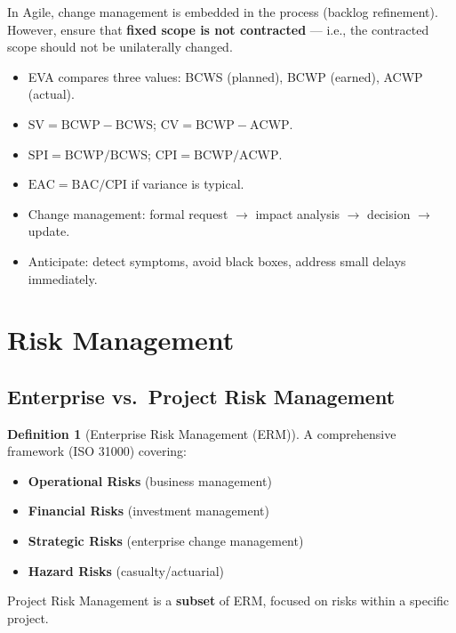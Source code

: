 \documentclass[11pt,a4paper]{article}
\theoremstyle{definition}
\newtheorem{definition}{Definition}[section]
\theoremstyle{plain}
\begin{document}
\begin{remark}
In Agile, change management is embedded in the process (backlog refinement). However, ensure that \textbf{fixed scope is not contracted} --- i.e., the contracted scope should not be unilaterally changed.
\end{remark}

\begin{keytakeaways}
\begin{itemize}[nosep]
  \item EVA compares three values: BCWS (planned), BCWP (earned), ACWP (actual).
  \item $\mathrm{SV} = \mathrm{BCWP} - \mathrm{BCWS}$; $\mathrm{CV} = \mathrm{BCWP} - \mathrm{ACWP}$.
  \item $\mathrm{SPI} = \mathrm{BCWP}/\mathrm{BCWS}$; $\mathrm{CPI} = \mathrm{BCWP}/\mathrm{ACWP}$.
  \item $\mathrm{EAC} = \mathrm{BAC}/\mathrm{CPI}$ if variance is typical.
  \item Change management: formal request $\to$ impact analysis $\to$ decision $\to$ update.
  \item Anticipate: detect symptoms, avoid black boxes, address small delays immediately.
\end{itemize}
\end{keytakeaways}


\section{Risk Management}

\subsection{Enterprise vs.\ Project Risk Management}

\begin{definition}[Enterprise Risk Management (ERM)]
A comprehensive framework (ISO 31000) covering:
\begin{itemize}[nosep]
  \item \textbf{Operational Risks} (business management)
  \item \textbf{Financial Risks} (investment management)
  \item \textbf{Strategic Risks} (enterprise change management)
  \item \textbf{Hazard Risks} (casualty/actuarial)
\end{itemize}
Project Risk Management is a \textbf{subset} of ERM, focused on risks within a specific project.
\end{definition}
\end{document}
